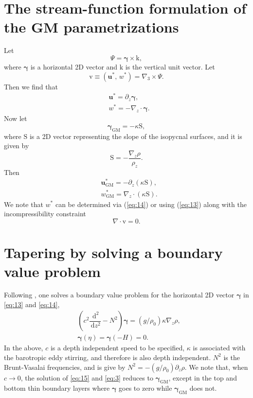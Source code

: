 \documentclass[12pt]{report}
\def\p{\partial}
\def\bs{\boldsymbol}
\def\ud{\,\mathrm{d}}
\def\ub{\mathbf{u}}
\def\vb{\bs{\mathrm{v}}}
\def\kb{\bs{\mathrm{k}}}
\def\Sb{\bs{\mathrm{S}}}
\begin{document}
\section{The stream-function formulation of the GM
  parametrizations}\label{sec:stre-funct-form} 
Let 
\begin{equation}
  \label{eq:10}
  \Psi = \bs{\gamma}\times\kb,
\end{equation}
where $\bs{\gamma}$ is a horizontal 2D vector and $\kb$ is the
vertical unit vector. Let 
\begin{equation}
  \label{eq:2}
  \vb \equiv (\ub^\ast,\,w^\ast) = \nabla_3 \times\Psi.
\end{equation}
Then we find that 
\begin{align}
  &\ub^\ast = \p_z\bs{\gamma},\label{eq:13}\\
 &w^\ast = -\nabla_z\cdot\bs{\gamma}.\label{eq:14}
\end{align}
Now let 
\begin{equation}
  \label{eq:11}
  \bs{\gamma}_\textrm{GM} = -\kappa\Sb,
\end{equation}
where $\Sb$ is a 2D vector representing the slope of the isopycnal
surfaces, and it is given by 
\begin{equation}
  \label{eq:9}
  \Sb = -\dfrac{\nabla_z \rho}{\rho_z}.
\end{equation}
Then
\begin{align}
  &\ub^\ast_\textrm{GM} = -\p_z(\kappa\Sb),  \label{eq:12}\\
  &w^\ast_\textrm{GM} = \nabla_z\cdot(\kappa \Sb).
\end{align}
We note that $w^\ast$ can be determined via (\ref{eq:14}) or using
(\ref{eq:13}) along with the incompressibility constraint
\begin{equation}
  \label{eq:2}
  \nabla \cdot \vb = 0. 
\end{equation}


\section{Tapering by solving a boundary value
  problem}\label{sec:taper-solv-bound}  
Following \cite{Ferrari10}, one solves a boundary value
problem for the horizontal 2D vector
$\bs{\gamma}$ in \eqref{eq:13} and \eqref{eq:14},
\begin{align}
  &\left( c^2\dfrac{\ud^2}{\ud z^2} - N^2\right)\bs{\gamma} =
  (g/\rho_0)\kappa \nabla_z\rho,\label{eq:15}\\
  &\bs{\gamma}(\eta) = \bs{\gamma}(-H) = 0.\label{eq:3}
\end{align}
In the above, $c$ is a depth independent speed to be specified,
$\kappa$ is associated with the barotropic eddy stirring, and
therefore is also depth independent. $N^2$ is the Brunt-Vasalai
frequencies, and is give by $N^2 = -(g/\rho_0)\p_z\rho$. We note that,
when $c\longrightarrow 0$, the solution of \eqref{eq:15} and
\eqref{eq:3} reduces to $\bs{\gamma}_\textrm{GM}$, except in the top
and bottom thin boundary layers where $\bs{\gamma}$ goes to zero
while $\bs{\gamma}_\textrm{GM}$ does not.
\end{document}
